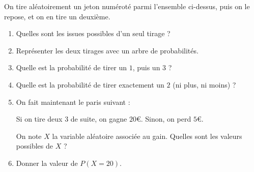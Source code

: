 \documentclass[
	classe=$1^{ere}STI2D$,
	landscape,
	twocolumn,
]{évaluation}
\begin{document}
\begin{center}
\end{center}
On tire aléatoirement un jeton numéroté parmi l'ensemble ci-dessus, puis on le repose, et on en tire un deuxième.
\begin{enumerate}
	\item Quelles sont les issues possibles d'un seul tirage ?
	\item Représenter les deux tirages avec un arbre de probabilités.
	\item Quelle est la probabilité de tirer un $1$, puis un $3$ ?
	\item Quelle est la probabilité de tirer exactement un $2$ (ni plus, ni moins) ?
	\item On fait maintenant le paris suivant :

	      Si on tire deux $3$ de suite, on gagne $20$€. Sinon, on perd $5$€.

	      On note $X$ la variable aléatoire associée au gain. Quelles sont les valeurs possibles de $X$ ?
	\item Donner la valeur de $P(X = 20)$.
\end{enumerate}
\end{document}
